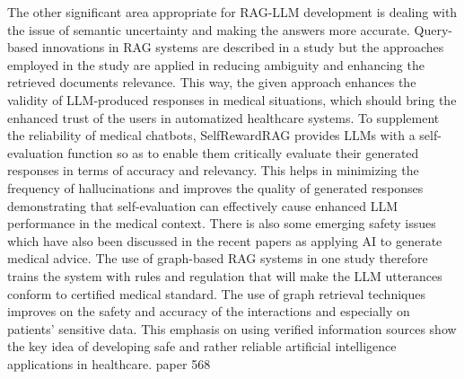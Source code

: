 The other significant area appropriate for RAG-LLM development is dealing with the issue of semantic uncertainty and making the answers more accurate. Query-based innovations in RAG systems are described in a study but the approaches employed in the study are applied in reducing ambiguity and enhancing the retrieved documents relevance. This way, the given approach enhances the validity of LLM-produced responses in medical situations, which should bring the enhanced trust of the users in automatized healthcare systems\cite{yang2024geometryqueriesquerybasedinnovations}. To supplement the reliability of medical chatbots, SelfRewardRAG\cite{10620139} provides LLMs with a self-evaluation function so as to enable them critically evaluate their generated responses in terms of accuracy and relevancy. This helps in minimizing the frequency of hallucinations and improves the quality of generated responses demonstrating that self-evaluation can effectively cause enhanced LLM performance in the medical context. There is also some emerging safety issues which have also been discussed in the recent papers as applying AI to generate medical advice. The use of graph-based RAG systems in one study therefore trains the system with rules and regulation that will make the LLM utterances conform to certified medical standard. The use of graph retrieval techniques improves on the safety and accuracy of the interactions and especially on patients' sensitive data. This emphasis on using verified information sources show the key idea of developing safe and rather reliable artificial intelligence applications in healthcare. paper 568